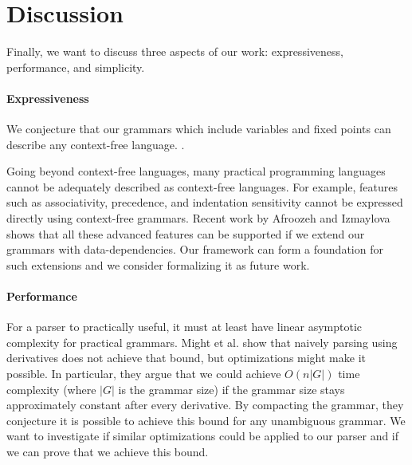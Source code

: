 \begin{code}[hide]%
\>[0]\AgdaSpace{}%
\AgdaSpace{}%
\<%
\end{code}

\section{Discussion}

Finally, we want to discuss three aspects of our work: expressiveness, performance, and simplicity.

\paragraph{Expressiveness} We conjecture that our grammars which include variables and fixed points can describe any context-free language.
.

Going beyond context-free languages, many practical programming languages cannot be adequately described as context-free languages. For example, features such as associativity, precedence, and indentation sensitivity cannot be expressed directly using context-free grammars. Recent work by Afroozeh and Izmaylova~\cite{one-parser-to-rule-them-all} shows that all these advanced features can be supported if we extend our grammars with data-dependencies. Our framework can form a foundation for such extensions and we consider formalizing it as future work.

\paragraph{Performance}
For a parser to practically useful, it must at least have linear asymptotic complexity for practical grammars. Might et al. \cite{parsing-with-derivatives} show that naively parsing using derivatives does not achieve that bound, but optimizations might make it possible. In particular, they argue that we could achieve $O(n|G|)$ time complexity (where $|G|$ is the grammar size) if the grammar size stays approximately constant after every derivative. By compacting the grammar, they conjecture it is possible to achieve this bound for any unambiguous grammar. We want to investigate if similar optimizations could be applied to our parser and if we can prove that we achieve this bound.

